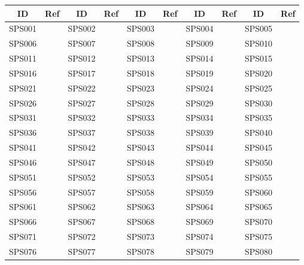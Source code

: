 \begin{table*}[htbp]
\begin{tabularx}{\textwidth}{c>{\centering\arraybackslash}X c>{\centering\arraybackslash}X c>{\centering\arraybackslash}X c>{\centering\arraybackslash}X c>{\centering\arraybackslash}X}
\textbf{ID} & \textbf{Ref} &
\textbf{ID} & \textbf{Ref} &
\textbf{ID} & \textbf{Ref} &
\textbf{ID} & \textbf{Ref} &
\textbf{ID} & \textbf{Ref} \\
\hline
SPS001 & \cite{1} & SPS002 & \cite{2} & SPS003 & \cite{3} & SPS004 & \cite{4} & SPS005 & \cite{5} \\
SPS006 & \cite{6} & SPS007 & \cite{7} & SPS008 & \cite{8} & SPS009 & \cite{9} & SPS010 & \cite{10} \\
SPS011 & \cite{11} & SPS012 & \cite{12} & SPS013 & \cite{13} & SPS014 & \cite{14} & SPS015 & \cite{15} \\
SPS016 & \cite{16} & SPS017 & \cite{17} & SPS018 & \cite{18} & SPS019 & \cite{19} & SPS020 & \cite{20} \\
SPS021 & \cite{21} & SPS022 & \cite{22} & SPS023 & \cite{23} & SPS024 & \cite{24} & SPS025 & \cite{25} \\
SPS026 & \cite{26} & SPS027 & \cite{27} & SPS028 & \cite{28} & SPS029 & \cite{29} & SPS030 & \cite{30} \\
SPS031 & \cite{31} & SPS032 & \cite{32} & SPS033 & \cite{33} & SPS034 & \cite{34} & SPS035 & \cite{35} \\
SPS036 & \cite{36} & SPS037 & \cite{37} & SPS038 & \cite{38} & SPS039 & \cite{39} & SPS040 & \cite{40} \\
SPS041 & \cite{41} & SPS042 & \cite{42} & SPS043 & \cite{43} & SPS044 & \cite{44} & SPS045 & \cite{45} \\
SPS046 & \cite{46} & SPS047 & \cite{47} & SPS048 & \cite{48} & SPS049 & \cite{49} & SPS050 & \cite{50} \\
SPS051 & \cite{51} & SPS052 & \cite{52} & SPS053 & \cite{53} & SPS054 & \cite{54} & SPS055 & \cite{55} \\
SPS056 & \cite{56} & SPS057 & \cite{57} & SPS058 & \cite{58} & SPS059 & \cite{59} & SPS060 & \cite{60} \\
SPS061 & \cite{61} & SPS062 & \cite{62} & SPS063 & \cite{63} & SPS064 & \cite{64} & SPS065 & \cite{65} \\
SPS066 & \cite{66} & SPS067 & \cite{67} & SPS068 & \cite{68} & SPS069 & \cite{69} & SPS070 & \cite{70} \\
SPS071 & \cite{71} & SPS072 & \cite{72} & SPS073 & \cite{73} & SPS074 & \cite{74} & SPS075 & \cite{75} \\
SPS076 & \cite{76} & SPS077 & \cite{77} & SPS078 & \cite{78} & SPS079 & \cite{79} & SPS080 & \cite{80} \\

\end{tabularx}
\end{table*}
